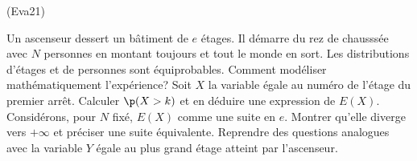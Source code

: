 \begin{tiny}(Eva21)\end{tiny} Un ascenseur dessert un bâtiment de $e$ étages. Il démarre du rez de chausssée avec $N$ personnes en montant toujours et tout le monde en sort. Les distributions d'étages et de personnes sont équiprobables. Comment modéliser mathématiquement l'expérience? Soit $X$ la variable égale au numéro de l'étage du premier arrêt. Calculer $\p(X>k)$ et en déduire une expression de $E(X)$.  Considérons, pour $N$ fixé, $E(X)$ comme une suite en $e$. Montrer qu'elle diverge vers $+ \infty$ et préciser une suite équivalente.\newline
Reprendre des questions analogues avec la variable $Y$ égale au plus grand étage atteint par l'ascenseur.